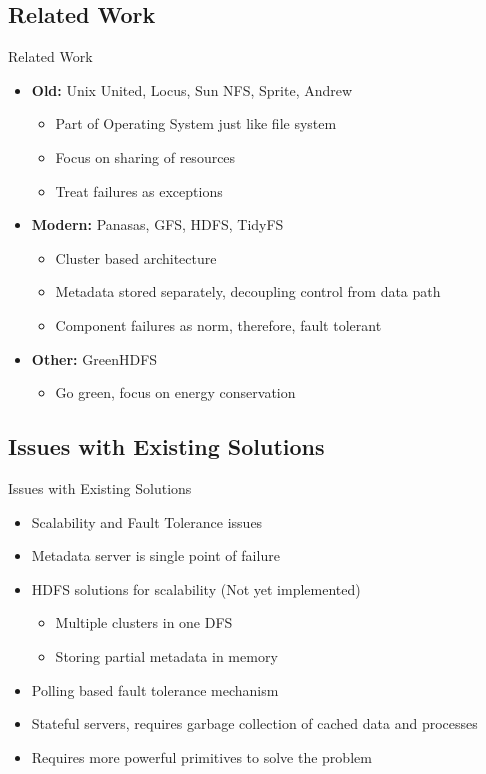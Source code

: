 \documentclass{beamer}
\begin{document}
\subsection{Related Work}
\begin{frame}{Related Work}
\begin{itemize}
\item \textbf{Old:} Unix United, Locus, Sun NFS, Sprite, Andrew
\begin{itemize}
\item Part of Operating System just like file system
\item Focus on sharing of resources
\item Treat failures as exceptions
\end{itemize}
\item \textbf{Modern:} Panasas, GFS, HDFS, TidyFS
\begin{itemize}
\item Cluster based architecture
\item Metadata stored separately, decoupling control from data path
\item Component failures as norm, therefore, fault tolerant
\end{itemize}
\item \textbf{Other:} GreenHDFS
\begin{itemize}
\item Go green, focus on energy conservation
\end{itemize}
\end{itemize}
\end{frame}

\subsection{Issues with Existing Solutions}
\begin{frame}{Issues with Existing Solutions}
\begin{itemize}
\item Scalability and Fault Tolerance issues
\item Metadata server is single point of failure
\item HDFS solutions for scalability (Not yet implemented)
\begin{itemize}
\item Multiple clusters in one DFS
\item Storing partial metadata in memory
\end{itemize}
\item Polling based fault tolerance mechanism
\item Stateful servers, requires garbage collection of cached data and processes
\item Requires more powerful primitives to solve the problem
\end{itemize}
\end{frame}
\end{document}
